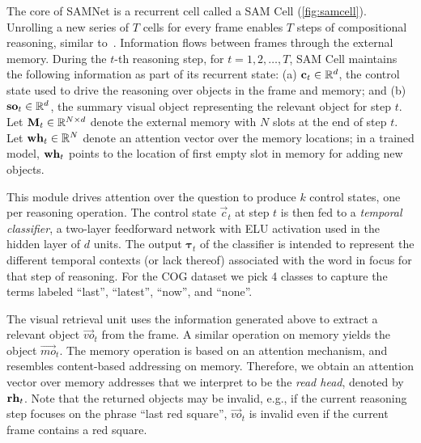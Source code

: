 The core of SAMNet is a recurrent cell called a SAM Cell (\cref{fig:samcell}). 
Unrolling a new series of $T$ cells for every frame enables $T$ steps of compositional
reasoning, similar to~\cite{hudson2018compositional}.
Information flows between frames through the external memory. 
During the $t$-th reasoning step, for $t=1,2, \dots, T$, SAM Cell maintains the following information as part of its recurrent state:
(a) $\mathbf{c}_t \in \mathbb{R}^d$, the control state used to drive the reasoning over objects in the frame and memory; and
(b) $\mathbf{so}_t  \in \mathbb{R}^d$, the summary visual object representing the relevant object for step $t$.
Let $\mathbf{M}_t \in  \mathbb{R}^{N \times d}$ denote the external memory with $N$ slots at the end of step $t$.
Let $\mathbf{wh}_t \in  \mathbb{R}^N$ denote an attention vector over the memory locations;
in a trained model, $\mathbf{wh}_t$ points to the location of first empty slot in memory for adding new objects.   

This module drives attention over the question to produce $k$ control states, one per reasoning operation. 
The control state $\vec{c}_t$ at step $t$ is then fed to a \emph{temporal classifier}, 
a two-layer feedforward network with ELU activation used in the hidden layer of $d$ units.
The output $\bm{\tau}_t$ of the classifier is intended to represent the different temporal contexts (or lack thereof) associated with the word in focus for that step of reasoning.	
For the COG dataset we pick 4 classes to capture the terms labeled ``last'', ``latest'', ``now'', and ``none''.

The visual retrieval unit uses the information generated above to extract a relevant object $\vec{vo}_t$ from the frame.
A similar operation on memory yields the object $\vec{mo}_t$. The memory operation is based on an attention mechanism,
and resembles content-based addressing on memory. Therefore, we obtain an attention vector over memory addresses
that we interpret to be the \emph{read head}, denoted by $\mathbf{rh}_t$.
Note that the returned objects may be invalid, 
e.g., if the current reasoning step focuses on the phrase ``last red square'', $\vec{vo}_t$ is invalid 
even if the current frame contains a red square. 

